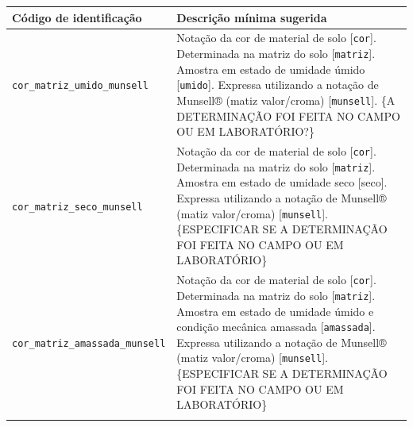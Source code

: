 \documentclass[a4paper,dvipsnames]{tufte-book}
\begin{document}
\begin{longtable}[]{@{}ll@{}}
\toprule
\begin{minipage}[b]{0.41\columnwidth}\raggedright\strut
Código de identificação\strut
\end{minipage} & \begin{minipage}[b]{0.34\columnwidth}\raggedright\strut
Descrição mínima sugerida\strut
\end{minipage}\tabularnewline
\midrule
\endhead
\begin{minipage}[t]{0.41\columnwidth}\raggedright\strut
\texttt{cor\_matriz\_umido\_munsell}\strut
\end{minipage} & \begin{minipage}[t]{0.34\columnwidth}\raggedright\strut
Notação da cor de material de solo {[}\texttt{cor}{]}. Determinada na
matriz do solo {[}\texttt{matriz}{]}. Amostra em estado de umidade úmido
{[}\texttt{umido}{]}. Expressa utilizando a notação de Munsell® (matiz
valor/croma) {[}\texttt{munsell}{]}. \{A DETERMINAÇÃO FOI FEITA NO CAMPO
OU EM LABORATÓRIO?\}\strut
\end{minipage}\tabularnewline
\begin{minipage}[t]{0.41\columnwidth}\raggedright\strut
\texttt{cor\_matriz\_seco\_munsell}\strut
\end{minipage} & \begin{minipage}[t]{0.34\columnwidth}\raggedright\strut
Notação da cor de material de solo {[}\texttt{cor}{]}. Determinada na
matriz do solo {[}\texttt{matriz}{]}. Amostra em estado de umidade seco
{[}seco{]}. Expressa utilizando a notação de Munsell® (matiz
valor/croma) {[}\texttt{munsell}{]}. \{ESPECIFICAR SE A DETERMINAÇÃO FOI
FEITA NO CAMPO OU EM LABORATÓRIO\}\strut
\end{minipage}\tabularnewline
\begin{minipage}[t]{0.41\columnwidth}\raggedright\strut
\texttt{cor\_matriz\_amassada\_munsell}\strut
\end{minipage} & \begin{minipage}[t]{0.34\columnwidth}\raggedright\strut
Notação da cor de material de solo {[}\texttt{cor}{]}. Determinada na
matriz do solo {[}\texttt{matriz}{]}. Amostra em estado de umidade úmido
e condição mecânica amassada {[}\texttt{amassada}{]}. Expressa
utilizando a notação de Munsell® (matiz valor/croma)
{[}\texttt{munsell}{]}. \{ESPECIFICAR SE A DETERMINAÇÃO FOI FEITA NO
CAMPO OU EM LABORATÓRIO\}\strut
\end{minipage}\tabularnewline
\begin{minipage}[t]{0.41\columnwidth}\raggedright\strut

\end{minipage}
\end{longtable}
\end{document}
